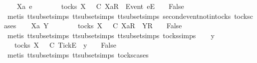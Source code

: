\begin{isabellebody}
\isamarkupfalse%
\isanewline
\ \ \isamarkupfalse%
\ Xa\ e\ {\isasymrho}\ {\isasymsigma}\isanewline
\ \ \isamarkupfalse%
\ {\isachardoublequoteopen}{\isasymrho}\ {\isasymin}\ tocks\ X\ {\isasymLongrightarrow}\ {\isasymrho}\ {\isasymsubseteq}\isactrlsub C\ {\isacharbrackleft}Xa{\isacharbrackright}\isactrlsub R\ {\isacharhash}\ {\isacharbrackleft}Event\ e{\isacharbrackright}\isactrlsub E\ {\isacharhash}\ {\isasymsigma}\ {\isasymLongrightarrow}\ False{\isachardoublequoteclose}\isanewline
\ \ \ \ \isamarkupfalse%
\ {\isacharparenleft}metis\ tt{\isacharunderscore}subset{\isachardot}simps{\isacharparenleft}{}{\isacharparenright}\ tt{\isacharunderscore}subset{\isachardot}simps{\isacharparenleft}{}{\isacharparenright}\ tt{\isacharunderscore}subset{\isachardot}simps{\isacharparenleft}{}{\isacharparenright}\ second{\isacharunderscore}event{\isacharunderscore}notin{\isacharunderscore}tocks\ tocks{\isachardot}cases{\isacharparenright}\isanewline
{}\isamarkupfalse%
\isanewline
\ \ \isamarkupfalse%
\ Xa\ Y\ {\isasymrho}\ {\isasymsigma}\isanewline
\ \ \isamarkupfalse%
\ {\isachardoublequoteopen}{\isasymrho}\ {\isasymin}\ tocks\ X\ {\isasymLongrightarrow}\ {\isasymrho}\ {\isasymsubseteq}\isactrlsub C\ {\isacharbrackleft}Xa{\isacharbrackright}\isactrlsub R\ {\isacharhash}\ {\isacharbrackleft}Y{\isacharbrackright}\isactrlsub R\ {\isacharhash}\ {\isasymsigma}\ {\isasymLongrightarrow}\ False{\isachardoublequoteclose}\isanewline
\ \ \ \ \isamarkupfalse%
\ {\isacharparenleft}metis\ tt{\isacharunderscore}subset{\isachardot}simps{\isacharparenleft}{}{\isacharparenright}\ tt{\isacharunderscore}subset{\isachardot}simps{\isacharparenleft}{}{\isacharparenright}\ tt{\isacharunderscore}subset{\isachardot}simps{\isacharparenleft}{}{\isacharparenright}\ tocks{\isachardot}simps{\isacharparenright}\isanewline
{}\isamarkupfalse%
\isanewline
\ \ \isamarkupfalse%
\ y\ {\isasymrho}\ {\isasymsigma}\isanewline
\ \ \isamarkupfalse%
\ {\isachardoublequoteopen}{\isasymrho}\ {\isasymin}\ tocks\ X\ {\isasymLongrightarrow}\ {\isasymrho}\ {\isasymsubseteq}\isactrlsub C\ {\isacharbrackleft}Tick{\isacharbrackright}\isactrlsub E\ {\isacharhash}\ y\ {\isacharhash}\ {\isasymsigma}\ {\isasymLongrightarrow}\ False{\isachardoublequoteclose}\isanewline
\ \ \ \ \isamarkupfalse%
\ {\isacharparenleft}metis\ tt{\isacharunderscore}subset{\isachardot}simps{\isacharparenleft}{}{}{\isacharparenright}\ tt{\isacharunderscore}subset{\isachardot}simps{\isacharparenleft}{}{\isacharparenright}\ tocks{\isachardot}cases{\isacharparenright}\isanewline

\end{isabellebody}
